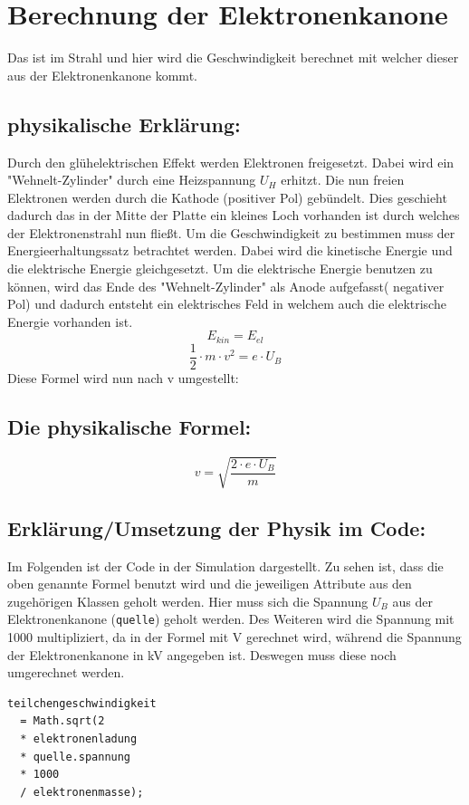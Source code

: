 \section{Berechnung der Elektronenkanone}
Das ist im Strahl und hier wird die Geschwindigkeit berechnet mit welcher dieser aus der Elektronenkanone kommt. 

\subsection{physikalische Erklärung:}

Durch den glühelektrischen Effekt werden Elektronen freigesetzt. Dabei wird ein "Wehnelt-Zylinder" durch eine Heizspannung $U_H$ erhitzt. Die nun freien Elektronen werden durch die Kathode (positiver Pol) gebündelt. Dies geschieht dadurch das in der Mitte der Platte ein kleines Loch vorhanden ist durch welches der Elektronenstrahl nun fließt. Um die Geschwindigkeit zu bestimmen muss der Energieerhaltungssatz betrachtet werden. Dabei wird die kinetische Energie und die elektrische Energie gleichgesetzt. Um die elektrische Energie benutzen zu können, wird das Ende des "Wehnelt-Zylinder" als Anode aufgefasst( negativer Pol) und dadurch entsteht ein elektrisches Feld in welchem auch die elektrische Energie vorhanden ist. 
$$ E_{kin} = E_{el}$$
$$ \frac{1}{2} \cdot m \cdot v^2 = e \cdot U_B$$
Diese Formel wird  nun nach v umgestellt:
\subsection{Die physikalische Formel:} 
$$ v = \sqrt{\frac{2 \cdot e \cdot U_B}{m}}$$

\subsection{Erklärung/Umsetzung der Physik im Code:}

Im Folgenden ist der Code in der Simulation dargestellt. Zu sehen ist, dass die oben genannte Formel benutzt wird und die jeweiligen Attribute aus den zugehörigen Klassen geholt werden. Hier muss sich die Spannung $U_B$ aus der Elektronenkanone (\lstinline$quelle$)  geholt werden. Des Weiteren wird die Spannung mit 1000 multipliziert, da in der Formel mit V gerechnet wird, während die Spannung der Elektronenkanone in kV angegeben ist. Deswegen muss diese noch umgerechnet werden.
\begin{lstlisting}
teilchengeschwindigkeit 
  = Math.sqrt(2 
  * elektronenladung 
  * quelle.spannung 
  * 1000 
  / elektronenmasse);
\end{lstlisting}

